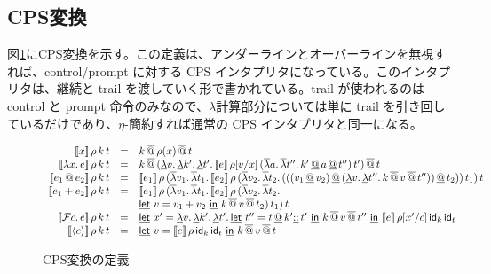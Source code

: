 \subsection{CPS変換}
図\ref{CPSTrans}にCPS変換を示す。この定義は、アンダーラインとオーバーラインを無視すれば、control/prompt に対する CPS インタプリタになっている。このインタプリタは、継続と trail を渡していく形で書かれている。trail が使われるのは control と prompt 命令のみなので、$\lambda$計算部分については単に trail を引き回しているだけであり、$\eta$-簡約すれば通常の CPS インタプリタと同一になる。
\begin{figure}[h]
\[
\begin{array}{rcl}
  \CPS{x}{\rho}{k}{t} & = & \SApp{\SApp{k}{\rho(x)}}{t}\\
  
  \CPS{\Lam{x}{e}}{\rho}{k}{t} & = & 
      {\SApp{\SApp{k}
                  {\DLamP{v}{\DLam{k'}{\DLam{t'}
                    {\CPS{e}{\rho[\Change{x}{v}]}
           {\SLamP{a}{\SLam{t''}
                 {\DApp{\DApp{k'}{a}}{t''}}}}
                  {t'}}}}}}
        {t}}\\
                  
  \CPS{\App{e_1}{e_2}}{\rho}{k}{t} & = & \CPS{e_1}{\rho}
      {\SLamP{v_1}{\SLam{t_1}{\CPS{e_2}{\rho}
            {\SLamP{v_2}{\SLam{t_2}
                {\DAppP{\DAppP{\DAppP{v_1}{v_2}}
                    {\DLamP{v}{\DLam{t''}
                        {\SApp{\SApp{k}{v}}{t''}}}}}{t_2}}}}{t_1}}}}{t}\\
  
  \CPS{e_1 + e_2}{\rho}{k}{t} & = & \CPSTh{e_1}\, \rho \,
      (\SLamS v_1 .\, \SLamS t_1 .\, \CPSTh{e_2} \, \rho \,
         (\SLamS v_2 .\, \SLamS t_2 .\,\\
  & &  \DLet{v}{v_1+v_2}{\SApp{k}{\SApp{v}{t_2}}})\, t_1)\, t\\
  
  \CPS{\Control{c}{e}}{\rho}{k}{t} & = & \DLet{x'}
      {\DLam{v}{\DLam{k'}{\DLam{t'}
        {\DLet{t''}{\DAppend{t}{\DCons{k'}{t'}}}{\SApp{\SApp{k}{v}}{t''}}}}}}
      {\CPS{e}{\rho[\Change{c}{x'}]}{\Idk}{\Idt}}\\
      
  \CPS{\Prompt{e}}{\rho}{k}{t} & = &
      \DLet{v}{\CPS{e}{\rho}{\Idk}{\Idt}}{\SApp{\SApp{k}{v}}{t}}\\

\end{array}
\]
\caption{CPS変換の定義}
\label{CPSTrans}
\end{figure}

